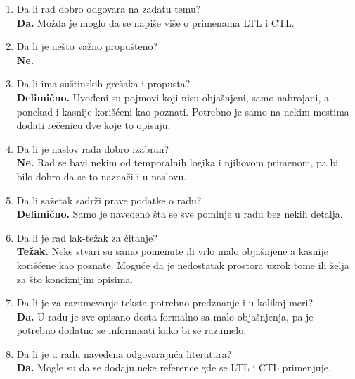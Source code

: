 \documentclass[a4paper]{report}
\begin{document}
\begin{enumerate}
\item Da li rad dobro odgovara na zadatu temu?\\

\textbf{Da.} Možda je moglo da se napiše više o primenama LTL i CTL.

\item Da li je nešto važno propušteno?\\

\textbf{Ne.}

\item Da li ima suštinskih grešaka i propusta?\\

\textbf{Delimično.} Uvođeni su pojmovi koji nisu objašnjeni, samo nabrojani, a ponekad i kasnije korišćeni kao poznati. Potrebno je samo na nekim mestima dodati rečenicu dve koje to opisuju.

\item Da li je naslov rada dobro izabran?\\

\textbf{Ne.} Rad se bavi nekim od temporalnih logika i njihovom primenom, pa bi bilo dobro da se to naznači i u naslovu.

\item Da li sažetak sadrži prave podatke o radu?\\

\textbf{Delimično.} Samo je navedeno šta se sve pominje u radu bez nekih detalja.

\item Da li je rad lak-težak za čitanje?\\

\textbf{Težak.} Neke stvari su samo pomenute ili vrlo malo objašnjene a kasnije korišćene kao poznate. Moguće da je nedostatak prostora uzrok tome ili želja za što konciznijim opisima. 

\item Da li je za razumevanje teksta potrebno predznanje i u kolikoj meri?\\

\textbf{Da.} U radu je sve opisano dosta formalno sa malo objašnjenja, pa je potrebno dodatno se informisati kako bi se razumelo.

\item Da li je u radu navedena odgovarajuća literatura?\\

\textbf{Da.} Mogle su da se dodaju neke reference gde se LTL i CTL primenjuje.


\end{enumerate}
\end{document}
